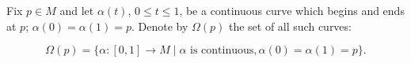 Fix $p \in M$ and let $\alpha(t)$, $0 \leq t \leq 1$, be a continuous curve which begins and ends at $p$; $\alpha(0) = \alpha(1) = p$. Denote by $\Omega(p)$ the set of all such curves:

$$\Omega(p) = \{\alpha: [0,1] \to M \mid \alpha \text{ is continuous}, \alpha(0) = \alpha(1) = p\}.$$
